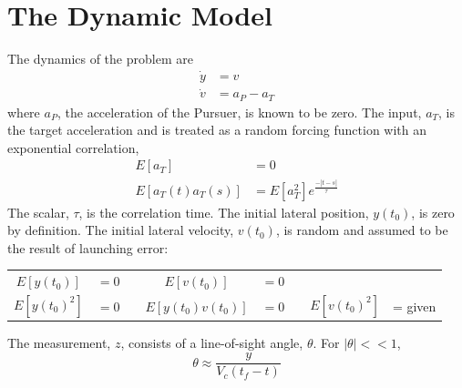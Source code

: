 \documentclass{article}
\begin{document}
\section{The Dynamic Model}
The dynamics of the problem are 
\begin{equation}
    \begin{split}
        \dot y & = v \\
        \dot v & = a_P - a_T    
    \end{split}
\end{equation}
where $a_P$, the acceleration of the Pursuer, is known to be zero. The input, $a_T$, is the target acceleration and is treated as a random forcing function with an exponential correlation,
\begin{equation}
    \begin{split}
        E[a_T] & = 0 \\
        E[a_T(t)a_T(s)] & = E[a_T^2] e^{\frac{-|t-s|}{\tau}}
    \end{split}
\end{equation}
The scalar, $\tau$, is the correlation time. The initial lateral position, $y(t_0)$, is zero by definition. The initial lateral velocity, $v(t_0)$, is random and assumed to 
be the result of launching error:

\begin{center}
    \begin{tabular}{c c c c c c c c }
        $E[y(t_0)]$   & $=0$ & \; & $E[v(t_0)]$ & $= 0$ & &  &  \\
        $E[y(t_0)^2]$ & $=0$ & \; & $E[y(t_0)v(t_0)]$ & $=0$& & $E[v(t_0)^2]$ &  = given
    \end{tabular}
\end{center}

The measurement, $z$, consists of a line-of-sight angle, $\theta$. For $|\theta|<<1$,
\begin{equation}
    \theta \approx \frac{y}{V_c (t_f - t)}
\end{equation}
\end{document}
